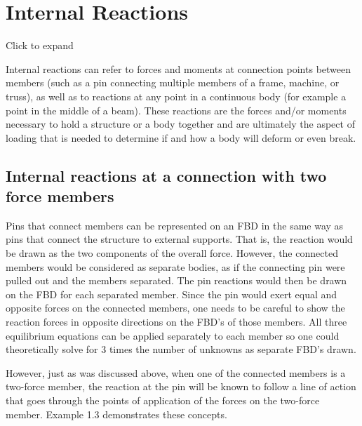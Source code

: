 \documentclass[
  letterpaper,
  DIV=11,
  numbers=noendperiod]{scrreprt}
\theoremstyle{definition}
\theoremstyle{remark}
\begin{document}
\section{Internal Reactions}\label{sec-1.2}

Click to expand

Internal reactions can refer to forces and moments at connection points
between members (such as a pin connecting multiple members of a frame,
machine, or truss), as well as to reactions at any point in a continuous
body (for example a point in the middle of a beam). These reactions are
the forces and/or moments necessary to hold a structure or a body
together and are ultimately the aspect of loading that is needed to
determine if and how a body will deform or even break.

\subsection{Internal reactions at a connection with two force
members}\label{internal-reactions-at-a-connection-with-two-force-members}

Pins that connect members can be represented on an FBD in the same way
as pins that connect the structure to external supports. That is, the
reaction would be drawn as the two components of the overall force.
However, the connected members would be considered as separate bodies,
as if the connecting pin were pulled out and the members separated. The
pin reactions would then be drawn on the FBD for each separated member.
Since the pin would exert equal and opposite forces on the connected
members, one needs to be careful to show the reaction forces in opposite
directions on the FBD's of those members. All three equilibrium
equations can be applied separately to each member so one could
theoretically solve for 3 times the number of unknowns as separate FBD's
drawn.

However, just as was discussed above, when one of the connected members
is a two-force member, the reaction at the pin will be known to follow a
line of action that goes through the points of application of the forces
on the two-force member. Example 1.3 demonstrates these concepts.
\end{document}
